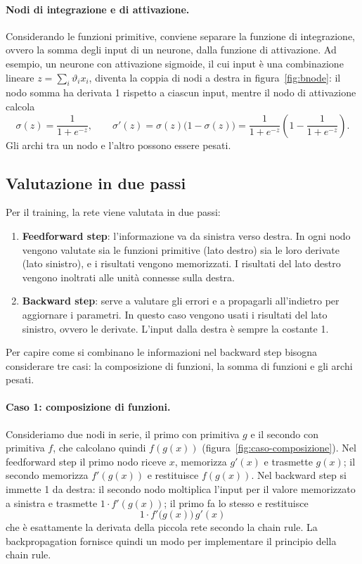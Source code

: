 \paragraph{Nodi di integrazione e di attivazione.}
Considerando le funzioni primitive, conviene separare la funzione di integrazione, ovvero la somma degli input di un neurone, dalla funzione di attivazione. Ad esempio, un neurone con attivazione sigmoide, il cui input è una combinazione lineare $z = \sum_i \vartheta_i x_i$, diventa la coppia di nodi a destra in figura~\ref{fig:bnode}: il nodo somma ha derivata 1 rispetto a ciascun input, mentre il nodo di attivazione calcola
\[
\sigma(z) = \frac{1}{1 + e^{-z}}, \qquad \sigma'(z) = \sigma(z)\big(1 - \sigma(z)\big) = \frac{1}{1 + e^{-z}}\left(1 - \frac{1}{1 + e^{-z}}\right).
\]
Gli archi tra un nodo e l'altro possono essere pesati.

\subsection{Valutazione in due passi}
Per il training, la rete viene valutata in due passi:
\begin{enumerate}
    \item \textbf{Feedforward step}: l'informazione va da sinistra verso destra. In ogni nodo vengono valutate sia le funzioni primitive (lato destro) sia le loro derivate (lato sinistro), e i risultati vengono memorizzati. I risultati del lato destro vengono inoltrati alle unità connesse sulla destra.
    \item \textbf{Backward step}: serve a valutare gli errori e a propagarli all'indietro per aggiornare i parametri. In questo caso vengono usati i risultati del lato sinistro, ovvero le derivate. L'input dalla destra è sempre la costante 1.
\end{enumerate}

Per capire come si combinano le informazioni nel backward step bisogna considerare tre casi: la composizione di funzioni, la somma di funzioni e gli archi pesati.

\paragraph{Caso 1: composizione di funzioni.}
Consideriamo due nodi in serie, il primo con primitiva $g$ e il secondo con primitiva $f$, che calcolano quindi $f(g(x))$ (figura~\ref{fig:caso-composizione}). Nel feedforward step il primo nodo riceve $x$, memorizza $g'(x)$ e trasmette $g(x)$; il secondo memorizza $f'(g(x))$ e restituisce $f(g(x))$. Nel backward step si immette 1 da destra: il secondo nodo moltiplica l'input per il valore memorizzato a sinistra e trasmette $1\cdot f'(g(x))$; il primo fa lo stesso e restituisce
\[
1\cdot f'\big(g(x)\big)\,g'(x)
\]
che è esattamente la derivata della piccola rete secondo la chain rule. La backpropagation fornisce quindi un modo per implementare il principio della chain rule.

